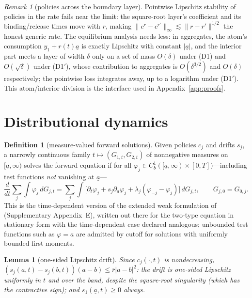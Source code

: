 \documentclass[11pt]{article}
\newtheorem{lemma}[theorem]{Lemma}
\theoremstyle{definition}
\newtheorem{definition}[theorem]{Definition}
\theoremstyle{remark}
\newtheorem{remark}[theorem]{Remark}
\newcommand{\ubar}[1]{\underline{#1}}
\newcommand{\dd}{\,d}
\newcommand{\uba}{\ubar{a}}
\begin{document}
\begin{remark}[policies across the boundary layer]
\label{rem:halfHolder}
Pointwise Lipschitz stability of policies in the rate fails near the
limit: the square-root layer's coefficient and its binding/release
times move with $r$, making $\|c^r-c^{r'}\|_\infty\lesssim
\|r-r'\|^{1/2}$ the honest generic rate. The equilibrium analysis
needs less: in aggregates, the atom's consumption
$y_1+r(t)\uba$ is exactly Lipschitz with constant $|\uba|$, and the
interior part meets a layer of width $\delta$ only on a set of mass
$O(\delta)$ under (D1) and $O(\sqrt\delta)$ under (D1$'$), whose
contribution to aggregates is $O(\delta^{3/2})$ and $O(\delta)$
respectively; the pointwise loss integrates away, up to a logarithm
under (D1$'$).
This atom/interior division is the interface used in
Appendix~\ref{app:proofs}.
\end{remark}

\section{Distributional dynamics}
\label{app:distribution}

\begin{definition}[measure-valued forward solutions]\label{def:KFweak}
Given policies $c_j$ and drifts $s_j$, a narrowly continuous family
$t\mapsto(G_{1,t},G_{2,t})$ of nonnegative measures on
$[\uba,\infty)$ solves the forward equation if for all
$\varphi_j\in C^1_b([\uba,\infty)\times[0,T])$---including test
functions \emph{not} vanishing at $\uba$---
\[
\frac{d}{dt}\sum_j\int\varphi_j\dd G_{j,t}
=\sum_j\int\Big[\partial_t\varphi_j+s_j\partial_a\varphi_j
+\lambda_j(\varphi_{-j}-\varphi_j)\Big]\dd G_{j,t},
\qquad G_{j,0}=G_{0,j}.
\]
This is the time-dependent version of the extended weak formulation of
\citet{AHLLM2022} (Supplementary Appendix~E), written out there for
the two-type equation in stationary form with the time-dependent case
declared analogous; unbounded test functions such as $\varphi=a$ are
admitted by cutoff for solutions with uniformly bounded first
moments.
\end{definition}

\begin{lemma}[one-sided Lipschitz drift]\label{lem:OSL}
Since $c_j(\cdot,t)$ is nondecreasing,
$(s_j(a,t)-s_j(b,t))(a-b)\le\bar r|a-b|^2$: the drift is one-sided
Lipschitz uniformly in $t$ and over the band, despite the square-root
singularity (which has the contractive sign); and
$s_1(\uba,t)\ge0$ always.
\end{lemma}
\end{document}

